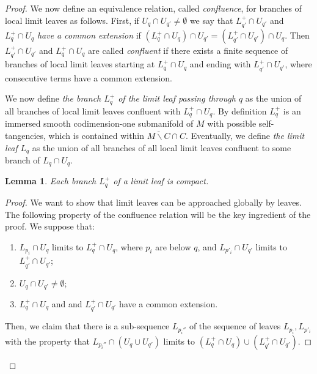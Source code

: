 \documentclass[10pt]{amsart}
\let\moins\smallsetminus
\newtheorem{lemma}[theorem]{Lemma}
\theoremstyle{definition}
\theoremstyle{remark}
\numberwithin{equation}{section}
\begin{document}
\begin{proof}
We now define an equivalence relation, called \emph{confluence},
for branches of local limit leaves as follows.
First, if $U_q\cap U_{q'}\neq \emptyset$
we say that $L^+_{q'}\cap U_{q'}$ and $L^+_{q}\cap U_{q}$ \emph{have a common extension} if
$(L^+_{q}\cap U_{q})\cap U_{q'}=(L^+_{q'}\cap U_{q'})\cap U_{q}$.
Then $L^+_{q'}\cap U_{q'}$ and $L^+_{q}\cap U_{q}$ are
called \emph{confluent} if there exists a finite sequence of branches of local limit leaves
starting at $L^+_{q}\cap U_{q}$ and ending with $L^+_{q'}\cap U_{q'}$, where
consecutive terms have a common extension.\enlargethispage{.5\baselineskip}%

We now define \emph{the branch $L_q^+$ of the limit leaf passing through $q$} as the union of all branches of local limit leaves confluent with $L^+_{q}\cap U_{q}$.
By definition $L_q^+$ is an immersed smooth codimension-one submanifold of $M$ with possible self-tangencies,
which is contained within $\overline{M\moins C}\cap C$.
Eventually, we define \emph{the limit leaf} $L_q$ as the union of all branches of
all local limit leaves confluent to some branch of $L_q\cap U_q$.

\begin{lemma}\label{compactlimitleaf}
Each branch $L^+_q$ of a limit leaf is compact.
\end{lemma}
\begin{proof}
We want to show that limit leaves can be approached globally by leaves.
The following property of the confluence relation will be the key ingredient of the proof.
We suppose that:
\begin{enumerate}
\item $L_{p_i}\cap U_q$ limits to $L_q^+\cap U_q$, where $p_i$ are below $q$,
and $L_{p'_i}\cap U_{q'}$ limits to $L_{q'}^+\cap U_{q'}$;
\item $U_q\cap U_{q'}\neq \emptyset$;
\item $L_q^+\cap U_q$ and
and $L_{q'}^+\cap U_{q'}$ have a common extension.
\end{enumerate}
Then, we claim that there is a sub-sequence $L_{p_i''}$ of the sequence
of leaves $L_{p_i}, L_{p'_i}$ with the property that
$L_{p_i''}\cap (U_q\cup U_{q'})$ limits to $(L^+_q\cap U_q) \cup (L^+_{q'}\cap U_{q'})$.


\end{proof}
\end{proof}
\end{document}
